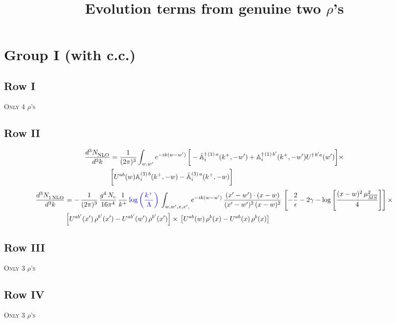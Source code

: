 \documentclass[9pt]{article}
\title{Evolution terms from genuine two $\rho$'s}
\author{}
\date{}
\def\mf#1{\mathbb{#1}}
\numberwithin{equation}{section}
\begin{document}
\maketitle
\section{Group I (with c.c.)}
\subsection{Row I}
\textsc{Only 4 $\rho$'s}
\subsection{Row II}
\begin{align}
    \frac{d^{3}N_{\rm NLO}^{\rm}}{d^{3}k} &  = \frac{1}{(2\pi)^{3}}  \int_{w, w^\prime} e^{-ik(w-w^\prime)}\,\bigg[-\bar{\mf{A}}^{\dagger\,(1)\,a}_{i}(k^{+},-w^{\prime})+\mf{A}^{\dagger\, (1)\, b^{\prime}}_{i}(k^{+},-w^{\prime})U^{\dagger\,b^{\prime}a}(w^{\prime})\bigg]\times \notag \\ & \bigg[U^{ab}(w)\mf{A}^{(3)\, b}_{i}(k^{+},- w)-\Bar{\mf{A}}^{(3)\, a}_{i}(k^{+}, - w)\bigg]\nonumber
\end{align}
\begin{align}
     \frac{d^{3}N_{1\,\rm NLO}^{\rm}}{d^{3}k} &  = -\,\frac{1}{(2\pi)^{3}}\, \frac{g^{4}\,N_{c}}{16\pi^{4}}\,\frac{1}{k^{+}}\,{\color{blue}\log{\left(\frac{k^{+}}{\Lambda}\right)}}\, \int_{w, w',x,x',} e^{-ik(w-w^\prime)}\, \frac{(x'-w')\cdot (x-w)}{(x'-w')^{2}\, (x-w)^{2}}\, \left[-\frac{2}{\epsilon}-2\gamma-\log{\left[\frac{(x-w)^{2}\,\mu^{2}_{\overline{MS}}}{4}\right]}\right]\times\notag \\ & \left[U^{ab'}(x')\,\rho^{b'}(x') - U^{ab'}(w')\,\rho^{b'}(x')\right]\times\,\left[U^{ab}(w)\,\rho^{b}(x) - U^{ab}(x)\,\rho^{b}(x)\right]
\end{align}
\subsection{Row III}
\textsc{Only 3 $\rho$'s}
\subsection{Row IV}
\textsc{Only 3 $\rho$'s}
\end{document}
